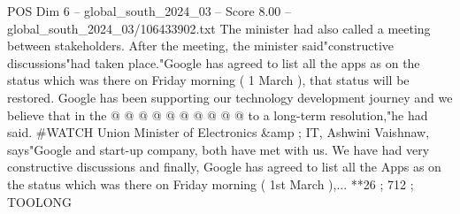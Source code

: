 \begin{textsample}{POS Dim 6 – global\_south\_2024\_03 – Score 8.00 – global\_south\_2024\_03/106433902.txt}
The minister had also called a meeting between stakeholders.
After the meeting, the minister said"constructive discussions"had taken place."Google has agreed to list all the apps as on the status which was there on Friday morning ( 1 March ), that status will be restored.
Google has been supporting our technology development journey and we believe that in the @ @ @ @ @ @ @ @ @ @ to a long-term resolution,"he had said. \#WATCH Union Minister of Electronics \&amp ; IT, Ashwini Vaishnaw, says"Google and start-up company, both have met with us.
We have had very constructive discussions and finally, Google has agreed to list all the Apps as on the status which was there on Friday morning ( 1st March ),... **26 ; 712 ; TOOLONG

\end{textsample}
